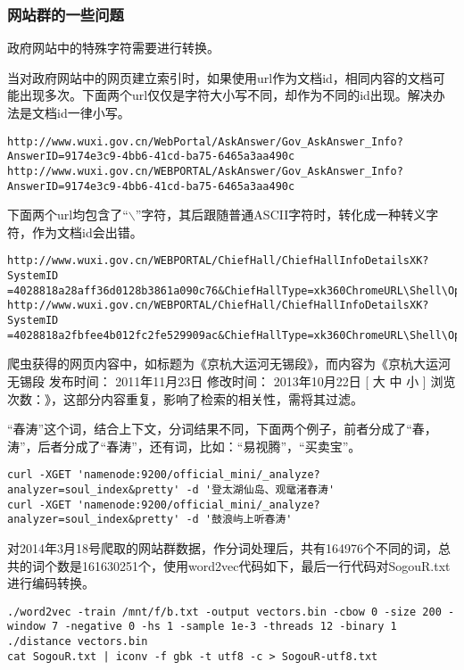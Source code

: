 \subsubsection{网站群的一些问题}
\par 政府网站中的特殊字符需要进行转换。
\par 当对政府网站中的网页建立索引时，如果使用url作为文档id，相同内容的文档可能出现多次。下面两个url仅仅是字符大小写不同，却作为不同的id出现。解决办法是文档id一律小写。
\begin{verbatim}
http://www.wuxi.gov.cn/WebPortal/AskAnswer/Gov_AskAnswer_Info?
AnswerID=9174e3c9-4bb6-41cd-ba75-6465a3aa490c
http://www.wuxi.gov.cn/WEBPORTAL/AskAnswer/Gov_AskAnswer_Info?
AnswerID=9174e3c9-4bb6-41cd-ba75-6465a3aa490c
\end{verbatim}
\par 下面两个url均包含了“$\backslash$”字符，其后跟随普通ASCII字符时，转化成一种转义字符，作为文档id会出错。
\begin{verbatim}
http://www.wuxi.gov.cn/WEBPORTAL/ChiefHall/ChiefHallInfoDetailsXK?SystemID
=4028818a28aff36d0128b3861a090c76&ChiefHallType=xk360ChromeURL\Shell\Open\Command
http://www.wuxi.gov.cn/WEBPORTAL/ChiefHall/ChiefHallInfoDetailsXK?SystemID
=4028818a2fbfee4b012fc2fe529909ac&ChiefHallType=xk360ChromeURL\Shell\Open\Command
\end{verbatim}
\par 爬虫获得的网页内容中，如标题为《京杭大运河无锡段》，而内容为《京杭大运河无锡段 发布时间： 2011年11月23日 修改时间： 2013年10月22日 [ 大 中 小 ] 浏览次数：》，这部分内容重复，影响了检索的相关性，需将其过滤。
\par “春涛”这个词，结合上下文，分词结果不同，下面两个例子，前者分成了“春，涛”，后者分成了“春涛”，还有词，比如：“易视腾”，“买卖宝”。
\begin{verbatim}
curl -XGET 'namenode:9200/official_mini/_analyze?analyzer=soul_index&pretty' -d '登太湖仙岛、观鼋渚春涛'
curl -XGET 'namenode:9200/official_mini/_analyze?analyzer=soul_index&pretty' -d '鼓浪屿上听春涛'
\end{verbatim}
\par 对2014年3月18号爬取的网站群数据，作分词处理后，共有164976个不同的词，总共的词个数是161630251个，使用word2vec代码如下，最后一行代码对SogouR.txt进行编码转换。
\begin{verbatim}
./word2vec -train /mnt/f/b.txt -output vectors.bin -cbow 0 -size 200 -window 7 -negative 0 -hs 1 -sample 1e-3 -threads 12 -binary 1
./distance vectors.bin
cat SogouR.txt | iconv -f gbk -t utf8 -c > SogouR-utf8.txt
\end{verbatim}

